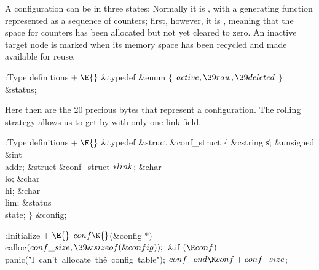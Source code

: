 A configuration can be in three states: Normally it is ,
with a generating function represented as a sequence of counters;
first, however, it is , meaning that the space for counters has
been
allocated but not yet cleared to zero. An inactive target node is
marked  when its memory space has been recycled and made
available for reuse.

\Y\B\4:Type definitions\X${}\mathrel+\E{}$\6
\&{typedef} \&{enum} ${}\{{}$\1\6
${}\\{active},\39\\{raw},\39\\{deleted}{}$\2\6
${}\}{}$ \&{status};\par
\fi

Here then are the 20 precious bytes that represent a configuration.
The rolling strategy allows us to get by with only one link field.

\Y\B\4:Type definitions\X${}\mathrel+\E{}$\6
\&{typedef} \&{struct} \&{conf\_struct} ${}\{{}$\1\6
\&{cstring} \|s;\6
\&{unsigned} \&{int} \\{addr};\6
\&{struct} \&{conf\_struct} ${}{*}\\{link}{}$;\6
\&{char} \\{lo};\6
\&{char} \\{hi};\6
\&{char} \\{lim};\6
\&{status} \\{state};\2%
\6
${}\}{}$ \&{config};\par
\fi

\B{}:Initialize\X${}\mathrel+\E{}$\6
$\\{conf}\K{}$(\&{config} ${}{*}){}$ \\{calloc}${}(\\{conf\_size},\39%
\&{sizeof}(\&{config}));{}$\6
\&{if} ${}(\R\\{conf}){}$\1\5
\\{panic}(\.{"I\ can't\ allocate\ th}\)\.{e\ config\ table"});\2\6
${}\\{conf\_end}\K\\{conf}+\\{conf\_size}{}$;\par
\fi

